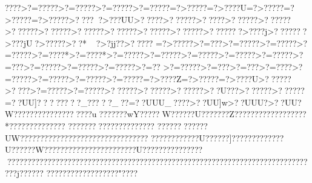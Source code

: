 {{{{{{{{{{{{{{{{{{{{{{{{{{{{{{{{{{{{{{{{{{{{{{{{{{{{{{{{{{{{{{{{{{{{{{{{{{{{{{{{{{{{{{{{{{{{{{{{{{{{{{{{{{{{{{{{{{{{{{{{{{{{{{{{{{{{{{{{{{{{{{{{{{{{{{{{{{{{{{{{{{{{{{{{{{{{{{{{{{{{{{{{{{{{{{{{{{{{{{{{{{{{{{{{{{{{{{{{{{{{{{{{{{{{{{{{{{{{{{{{{{{{{{{{{{{{{{{{{{{{{{{{{{{{{{{{{{{{{{{{{{{{{{{{{{{{{{{{{{{{{{{{{{{{{{{{{{{{{{{{{{{{{{{{{{{{{{{{{{{{{{{{{{{{{{{{{{{{{{{{{{{{{{{{{{{{{{{{{{{{{{{{{{{{{{{{{{{{{{{{{{{{{{{{{{{{{{{{{{{{{{{{{{{{{{{{{{{{{{{{{{{{{{{{{{{{{{{{{{{{{{{{{{{{{{{{{{{{{{{{{{{{{{{{{{{{{{{{{{{{{{{{{{{{{{{{{{{{{{{{{{{{{{{{{{{{{{{{{{{{{{{{{{{{{{{{{{{{{{{{{{{{{{{{{{{{{{{{{{{{{{{{{{{{{{{{{{{{{{{{{{{{{{{{{{{{{{{{{{{{{{{{{{{{{{{{{{{{{{{{{{{{{{{{{{{{{{{{{{{{{{{{{{{{{{{{{{{{{{{{{{{{{{{{{{{{{{{{{{{{{{{{{{{{{{{{{{{{{{{{{{{{{{{{{{{{{{{{{{{{{{{{{{{{{{{{{{{{{{{{{{{{{{{{{{{{{{{{{{{{{{{{{{{{{{{{{{{{{{{{{{{{{{{{{{{{{{{{{{{{{{{{{{{{{{{{{{{{{{{{{{{{{{{{{{{{{{{{{{{{{{{{{{{{{{{{{{{{{{{{{{{{{{{{{{{{{{{{{{{{{{{{{{{{{{{{{{{{{{{{{{{{{{{{{{{{{{{{{{{{{{{{{{{{{{{{{{{{{{{{{{{{{{{{{{{{{{{{{{{{{{{{{{{{{{{{{{{{{{{{{{{{{{{{{{{{{{{{{{{{{{{{{{{{{{{{{{{{{{{{{{{{{{{{{{{{{{{{{{{{{{{{{{{{{{{{{{{{{{{{{{{{{{{{{{{{{{{{{{{{{{{{{{{{{{{{{{{{{{{{{{{{{{{{{{{{{{{{{{{{{{{{{{{{{{{{{{{{{{{{{{{{{{{{{{{{{{{{{{{{{{{{{{{{{{{{{{{{{{{{{{{{{{{{{{{{{{{{{{{{{{{{{{{{{{{{{{{{{{{{{{{{{{{{{{{{{{{{{{{{{{{{{{{{{{{{{{{{{{{{{{{{{{{{{{{{{{{{{{{{{{{{{{{{{{{{{{{{{{{{{{{{{{{{{{{{{{{{{{{{{{{{{{{{{{{{{{{{{{{{{{{{{{{{{{{{{{{{{{{{{{{{{{{{{{{{{{{{{{{{{{{{{{{{{{{{{{{{{{{{{{{{{{{{{{{{{{{{{{{{{{{{{{{{{{{{{{{{{{{{{{{{{{{{{{{{{{{{{{{{{{{{{{{{{{{{{{{{{{{{{{{{{{{{{{{{{{{{{{{{{{{{{{{{{{{{{{{{{{{{{{{{{{{{{{{{{{{{{{{{{{{{{{{{{{{{{{{{{{{{{{{{{{{{{{{{{{{{{{{{{{{{{{{{{{{{{{{{{{{{{{{{{{{{{{{{{{{{{{{{{{{{{{{{{{{{{{{{{{{{{{{{{{{{{{{{{{{{{{{{{{{{{{{{{{{{{{{{{{{{{{{{{{{{{{{{{{{{{{{{{{{{{{{{{{{{{{{{{{{{{{{{{{{{{{{{{{{{{{{{{{{{{{{{{{{{{{{{{{{{{{{{{{{{{{{{{{{{{{{{{{{{{{{{{{{{{{{{{{{{{{{{{{{{{{{{{{{{{{{{{{{{{{{{{{{{{{{{{{{{{{{{{{{{{{{{{{{{{{{{{{{{{{{{{{{{{{{{{{{{{{{{{{{{{????>?=?????>?=?????>?=?????>?=?????=?>?????=?>????U=?>?????=?>?????=?>?????>???? ?>???UU>????? >??????>????? >??????>??????>??????>??????>??????>??????>??????>??????>???????>????j>???????>???jU?>?????>??*?>?jj??>?????
=?>?????>?=???>?=?????>?=?????>?=?????>?=????*>?=????*>?=?????>?=?????>?=?????>?=?????>?=?????>?=???>?=?????>?=?????>?=?????>?=??   >?=?????>?=???  >?=???  >?=???? >?=?????>?=?????>?=?????>?=?????=?>????Z=?>?????=?>????U>??????>????>?=?????>?=?????>??????>??????>??????>??U???>??????>??????=??UU]????????_?????_??=??UUU_????  >??UU]w>??UUU?>??UU?W???????????????????u???????wY?????W??????U???????Z??????????????????*??????????????
????????????????????? ?????? ??????UW?????????????????????? ??????????
??????? ?????U??????]????????   ?????U??????W???????????????????????U?????????????????????????????????????????????????????????????????????????????????????????????j??????
??????????????????"  ???? }}}}}}}}}}}}}}}}}}}}}}}}}}}}}}}}}}}}}}}}}}}}}}}}}}}}}}}}}}}}}}}}}}}}}}}}}}}}}}}}}}}}}}}}}}}}}}}}}}}}}}}}}}}}}}}}}}}}}}}}}}}}}}}}}}}}}}}}}}}}}}}}}}}}}}}}}}}}}}}}}}}}}}}}}}}}}}}}}}}}}}}}}}}}}}}}}}}}}}}}}}}}}}}}}}}}}}}}}}}}}}}}}}}}}}}}}}}}}}}}}}}}}}}}}}}}}}}}}}}}}}}}}}}}}}}}}}}}}}}}}}}}}}}}}}}}}}}}}}}}}}}}}}}}}}}}}}}}}}}}}}}}}}}}}}}}}}}}}}}}}}}}}}}}}}}}}}}}}}}}}}}}}}}}}}}}}}}}}}}}}}}}}}}}}}}}}}}}}}}}}}}}}}}}}}}}}}}}}}}}}}}}}}}}}}}}}}}}}}}}}}}}}}}}}}}}}}}}}}}}}}}}}}}}}}}}}}}}}}}}}}}}}}}}}}}}}}}}}}}}}}}}}}}}}}}}}}}}}}}}}}}}}}}}}}}}}}}}}}}}}}}}}}}}}}}}}}}}}}}}}}}}}}}}}}}}}}}}}}}}}}}}}}}}}}}}}}}}}}}}}}}}}}}}}}}}}}}}}}}}}}}}}}}}}}}}}}}}}}}}}}}}}}}}}}}}}}}}}}}}}}}}}}}}}}}}}}}}}}}}}}}}}}}}}}}}}}}}}}}}}}}}}}}}}}}}}}}}}}}}}}}}}}}}}}}}}}}}}}}}}}}}}}}}}}}}}}}}}}}}}}}}}}}}}}}}}}}}}}}}}}}}}}}}}}}}}}}}}}}}}}}}}}}}}}}}}}}}}}}}}}}}}}}}}}}}}}}}}}}}}}}}}}}}}}}}}}}}}}}}}}}}}}}}}}}}}}}}}}}}}}}}}}}}}}}}}}}}}}}}}}}}}}}}}}}}}}}}}}}}}}}}}}}}}}}}}}}}}}}}}}}}}}}}}}}}}}}}}}}}}}}}}}}}}}}}}}}}}}}}}}}}}}}}}}}}}}}}}}}}}}}}}}}}}}}}}}}}}}}}}}}}}}}}}}}}}}}}}}}}}}}}}}}}}}}}}}}}}}}}}}}}}}}}}}}}}}}}}}}}}}}}}}}}}}}}}}}}}}}}}}}}}}}}}}}}}}}}}}}}}}}}}}}}}}}}}}}}}}}}}}}}}}}}}}}}}}}}}}}}}}}}}}}}}}}}}}}}}}}}}}}}}}}}}}}}}}}}}}}}}}}}}}}}}}}}}}}}}}}}}}}}}}}}}}}}}}}}}}}}}}}}}}}}}}}}}}}}}}}}}}}}}}}}}}}}}}}}}}}}}}}}}}}}}}}}}}}}}}}}}}}}}}}}}}}}}}}}}}}}}}}}}}}}}}}}}}}}}}}}}}}}}}}}}}}}}}}}}}}}}}}}}}}}}}}}}}}}}}}}}}}}}}}}}}}}}}}}}}}}}}}}}}}}}}}}}}}}}}}}}}}}}}}}}}}}}}}}}}}}}}}}}}}}}}}}}}}}}}}}}}}}}}}}}}}}}}}}}}}}}}}}}}}}}}}}}}}}}}}}}}}}}}}}}}}}}}}}}}}}}}}}}}}}}}}}}}}}}}}}}}}}}}}}}}}}}}}}}}}}}}}}}}}}}}}}}}}}}}}}}}}}}}}}}}}}}}}}}}}}}}}}}}}}}}}}}}}}}}}}}}}}}}}}}}}}}}}}}}}}}}}}}}}}}}}}}}}}}}}}}}}}}}}}}}}}}}}}}}}}}}}}}}}}}}}}}}}}}}}}}}}}}}}}}}}}}}}}}}}}}}}}}}}}}}}}}}}}}}}}}}}}}}}}}}}}}}}}}}}}}}}}}}}}}}}}}}}}}}}}}}}}}}}}}}}}}}}}}}}}}}}}}}}}}}}}}}}}}}}}}}}}}}}}}}}}}}}}}}}}}}}}}}}}}}}}}}}}}}}}}}}}}}}}}}}}}}}}}}}}}}}}}}}}}}}}}}}}}}}}}}}}}}}}}
